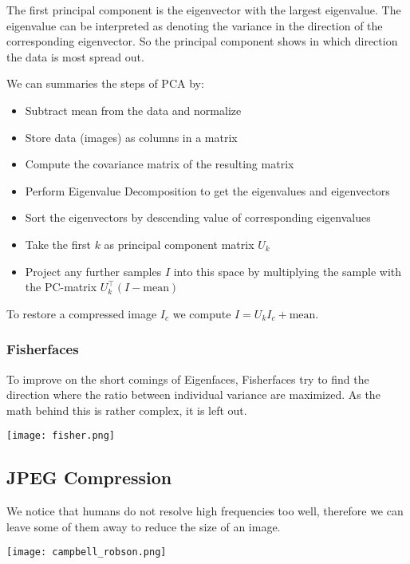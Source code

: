 The first principal component is the eigenvector with the largest eigenvalue. The eigenvalue can be interpreted as denoting the variance in the direction of the corresponding eigenvector. So the principal component shows in which direction the data is most spread out. \medskip

We can summaries the steps of PCA by:
\begin{itemize}
	\item Subtract mean from the data and normalize
	\item Store data (images) as columns in a matrix
	\item Compute the covariance matrix of the resulting matrix
	\item Perform Eigenvalue Decomposition to get the eigenvalues and eigenvectors
	\item Sort the eigenvectors by descending value of corresponding eigenvalues
	\item Take the first $k$ as principal component matrix $U_k$
	\item Project any further samples $I$ into this space by multiplying the sample with the PC-matrix $U_k^\top (I - \text{mean})$
\end{itemize}

To restore a compressed image $I_c$ we compute $I = U_k I_c + \text{mean}$.

\subsubsection{Fisherfaces}

To improve on the short comings of Eigenfaces, Fisherfaces try to find the direction where the ratio between individual variance are maximized. As the math behind this is rather complex, it is left out.
\begin{center}
	\texttt{[image: fisher.png]}
\end{center}


\subsection{JPEG Compression}

We notice that humans do not resolve high frequencies too well, therefore we can leave some of them away to reduce the size of an image.
\begin{center}
	\texttt{[image: campbell\_robson.png]}
\end{center}

